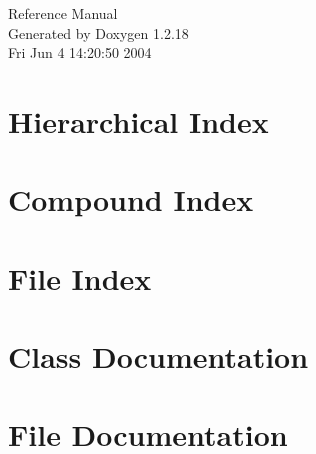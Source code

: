 \documentclass[a4paper]{book}
\begin{document}
\begin{titlepage}
\vspace*{7cm}
\begin{center}
{\Large Reference Manual}\\
\vspace*{1cm}
{\large Generated by Doxygen 1.2.18}\\
\vspace*{0.5cm}
{\small Fri Jun 4 14:20:50 2004}\\
\end{center}
\end{titlepage}
\clearemptydoublepage
{}
\tableofcontents
\clearemptydoublepage
{}
\chapter{Hierarchical Index}

\chapter{Compound Index}

\chapter{File Index}

\chapter{Class Documentation}






\chapter{File Documentation}

\printindex
\end{document}
